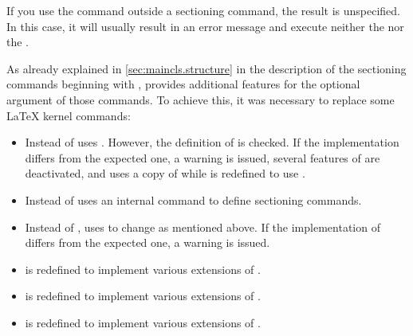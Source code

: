 If you use the command outside a sectioning command, the result is
unspecified. In this case, it will usually result in an error message and
execute neither the  nor the .%
\EndIndexGroup

\begin{Declaration}
                          \PValue{*}%
\end{Declaration}
As already explained in \autoref{sec:maincls.structure} in the
description of the sectioning commands beginning with
, \KOMAScript{} provides additional features
for the optional argument of those commands. To achieve this, it was necessary
to replace some \LaTeX{} kernel commands:
\begin{itemize}
\item Instead of
  \KOMAScript{} uses . However, the definition of
   is checked. If the implementation differs from the
  expected one, a warning is issued, several features of \KOMAScript{}
  are deactivated, and  uses a copy of
   while  is redefined to use
  .
\item Instead of 
  \KOMAScript{} uses an internal command to define sectioning commands.
\item Instead of ,
  \KOMAScript{} uses  to change  as
  mentioned above. If the implementation of  differs from the
  expected one, a warning is issued.
\item {} is redefined to
  implement various extensions of \KOMAScript.
\item {} is redefined
  to implement various extensions of \KOMAScript.
\item {} is redefined
  to implement various extensions of \KOMAScript.
\end{itemize}
